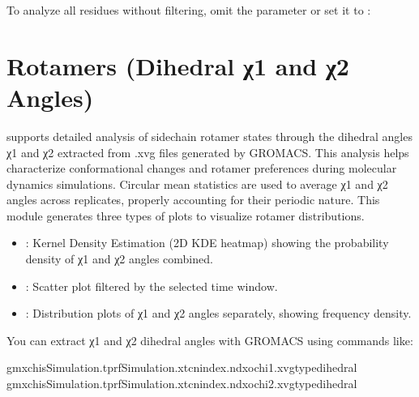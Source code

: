 \documentclass[a4paper,10pt,english]{sphinxmanual}
\begin{document}
\sphinxAtStartPar
To analyze all residues without filtering, omit the  parameter or set it to :

\begin{sphinxVerbatim}[commandchars=\\\{\}]
\end{sphinxVerbatim}


\section{Rotamers (Dihedral χ1 and χ2 Angles)}
\label{\detokenize{Input:rotamers-dihedral-1-and-2-angles}}
\sphinxAtStartPar
{} supports detailed analysis of side\sphinxhyphen{}chain rotamer states through the dihedral angles χ1 and χ2 extracted from .xvg files generated by GROMACS. This analysis helps characterize conformational changes and rotamer preferences during molecular dynamics simulations. Circular mean statistics are used to average χ1 and χ2 angles across replicates, properly accounting for their periodic nature. This module generates three types of plots to visualize rotamer distributions.
\begin{itemize}
\item {} 
\sphinxAtStartPar
{}: Kernel Density Estimation (2D KDE heatmap) showing the probability density of χ1 and χ2 angles combined.

\item {} 
\sphinxAtStartPar
{}: Scatter plot filtered by the selected time window.

\item {} 
\sphinxAtStartPar
{}: Distribution plots of χ1 and χ2 angles separately, showing frequency density.

\end{itemize}

\sphinxAtStartPar
You can extract χ1 and χ2 dihedral angles with GROMACS using commands like:

\begin{sphinxVerbatim}[commandchars=\\\{\}]
gmxchi\PYGZhy{}sSimulation.tpr\PYGZhy{}fSimulation.xtc\PYGZhy{}nindex.ndx\PYGZhy{}ochi1.xvg\PYGZhy{}typedihedral
gmxchi\PYGZhy{}sSimulation.tpr\PYGZhy{}fSimulation.xtc\PYGZhy{}nindex.ndx\PYGZhy{}ochi2.xvg\PYGZhy{}typedihedral
\end{sphinxVerbatim}
\end{document}
